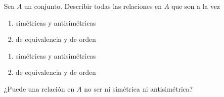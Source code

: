 \begin{enunciado}{\ejercicio}

  Sea $A$ un conjunto. Describir todas las relaciones en $A$ que son a la vez
  \begin{multicols}{2}
    \begin{enumerate}[label=\roman*)]
      \item simétricas y antisimétricas\\ 
      \item de equivalencia y de orden\\ 
    \end{enumerate}
  \end{multicols}

\end{enunciado}

\begin{enumerate}[label=\roman*)]
  \item simétricas y antisimétricas\\ 
  \item de equivalencia y de orden\\ 
\end{enumerate}
¿Puede una relación en $A$ no ser ni simétrica ni antisimétrica? \\
